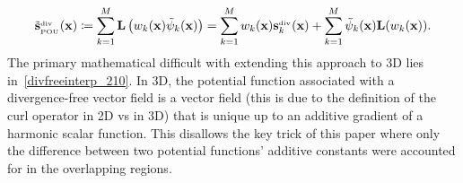 \begin{align}
\tilde{\mathbf{s}}^{_{\text{div}}}_{_{\text{POU}}}(\mathbf{x}) \coloneqq \sum\limits_{k=1}^{M} \mathbf{L} \left(w_k(\mathbf{x}) \tilde{\psi}_k(\mathbf{x})\right) = \sum\limits_{k=1}^{M} w_k(\mathbf{x}) \mathbf{s}_k^{_{\text{div}}}(\mathbf{x}) + \sum\limits_{k=1}^{M} \tilde{\psi}_k(\mathbf{x}) \mathbf{L}(w_k(\mathbf{x})). \label{divfreelocalpou}
\end{align}
%
The primary mathematical difficult with extending this approach to 3D lies in~\eqref{divfreeinterp_210}. In 3D, the potential function associated with a divergence-free vector field is a vector field (this is due to the definition of the curl operator in 2D vs in 3D) that is unique up to an additive gradient of a harmonic scalar function. This disallows the key trick of this paper where only the difference between two potential functions' additive constants were accounted for in the overlapping regions.

